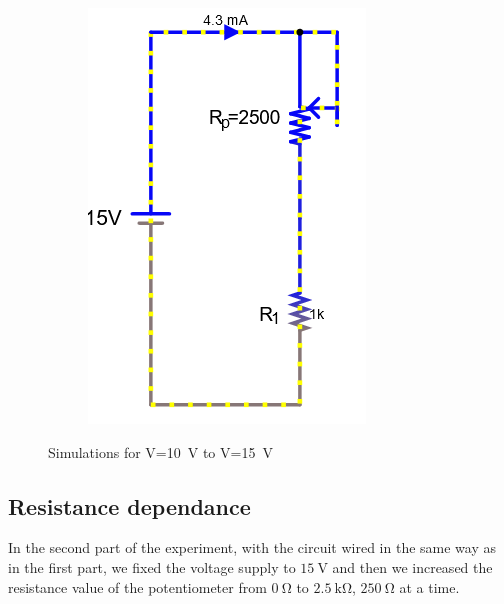 \documentclass[a4paper]{article}
\begin{document}
\begin{figure}[H]
\begin{subfigure}{0.333\textwidth}
        \includegraphics[width=.9\linewidth]{amp15}
    \end{subfigure}
    \caption{Simulations for V=\SI{10}{\volt} to V=\SI{15}{\volt} }
    \label{fig:2}
\end{figure}
\subsection{Resistance dependance}
In the second part of the experiment, with the circuit wired in the same way as in the first
part, we fixed the voltage
supply to $\SI{15}{\volt}$ and then we increased the resistance value of the potentiometer from
$\SI{0}{\ohm}$ to $\SI{2.5}{\kilo\ohm}$, $\SI{250}{\ohm}$ at a time.
\end{document}
